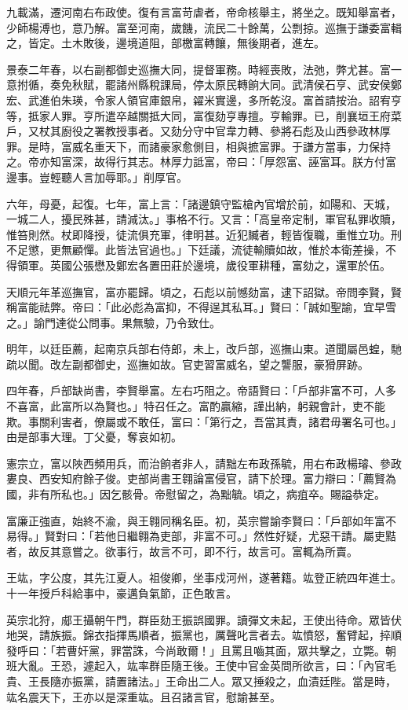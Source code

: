 \begin{pinyinscope}
九載滿，遷河南右布政使。復有言富苛虐者，帝命核舉主，將坐之。既知舉富者，少師楊溥也，意乃解。富至河南，歲饑，流民二十餘萬，公剽掠。巡撫于謙委富輯之，皆定。土木敗後，邊境道阻，部檄富轉饟，無後期者，進左。

景泰二年春，以右副都御史巡撫大同，提督軍務。時經喪敗，法弛，弊尤甚。富一意拊循，奏免秋賦，罷諸州縣稅課局，停太原民轉餉大同。武清侯石亨、武安侯鄭宏、武進伯朱瑛，令家人領官庫銀帛，糴米實邊，多所乾沒。富首請按治。詔宥亨等，抵家人罪。亨所遣卒越關抵大同，富復劾亨專擅。亨輸罪。已，削襄垣王府菜戶，又杖其廚役之署教授事者。又劾分守中官韋力轉、參將石彪及山西參政林厚罪。是時，富威名重天下，而諸豪家愈側目，相與摭富罪。于謙方當事，力保持之。帝亦知富深，故得行其志。林厚力詆富，帝曰：「厚怨富、誣富耳。朕方付富邊事。豈輕聽人言加辱耶。」削厚官。

六年，母憂，起復。七年，富上言：「諸邊鎮守監槍內官增於前，如陽和、天城，一城二人，擾民殊甚，請減汰。」事格不行。又言：「高皇帝定制，軍官私罪收贖，惟笞則然。杖即降授，徒流俱充軍，律明甚。近犯贓者，輕皆復職，重惟立功。刑不足懲，更無顧憚。此皆法官過也。」下廷議，流徒輸贖如故，惟於本衛差操，不得領軍。英國公張懋及鄭宏各置田莊於邊境，歲役軍耕種，富劾之，還軍於伍。

天順元年革巡撫官，富亦罷歸。頃之，石彪以前憾劾富，逮下詔獄。帝問李賢，賢稱富能祛弊。帝曰：「此必彪為富抑，不得逞其私耳。」賢曰：「誠如聖諭，宜早雪之。」諭門達從公問事。果無驗，乃令致仕。

明年，以廷臣薦，起南京兵部右侍郎，未上，改戶部，巡撫山東。道聞屬邑蝗，馳疏以聞。改左副都御史，巡撫如故。官吏習富威名，望之讋服，豪猾屏跡。

四年春，戶部缺尚書，李賢舉富。左右巧阻之。帝語賢曰：「戶部非富不可，人多不喜富，此富所以為賢也。」特召任之。富酌贏縮，謹出納，躬親會計，吏不能欺。事關利害者，僚屬或不敢任，富曰：「第行之，吾當其責，諸君毋署名可也。」由是部事大理。丁父憂，奪哀如初。

憲宗立，富以陜西頻用兵，而治餉者非人，請黜左布政孫毓，用右布政楊璿、參政婁良、西安知府餘子俊。吏部尚書王翱論富侵官，請下於理。富力辯曰：「薦賢為國，非有所私也。」因乞骸骨。帝慰留之，為黜毓。頃之，病疽卒。賜謚恭定。

富廉正強直，始終不渝，與王翱同稱名臣。初，英宗嘗諭李賢曰：「戶部如年富不易得。」賢對曰：「若他日繼翱為吏部，非富不可。」然性好疑，尤惡干請。屬吏黠者，故反其意嘗之。欲事行，故言不可，即不行，故言可。富輒為所賣。

王竑，字公度，其先江夏人。祖俊卿，坐事戍河州，遂著籍。竑登正統四年進士。十一年授戶科給事中，豪邁負氣節，正色敢言。

英宗北狩，郕王攝朝午門，群臣劾王振誤國罪。讀彈文未起，王使出待命。眾皆伏地哭，請族振。錦衣指揮馬順者，振黨也，厲聲叱言者去。竑憤怒，奮臂起，捽順發呼曰：「若曹奸黨，罪當誅，今尚敢爾！」且罵且嚙其面，眾共擊之，立斃。朝班大亂。王恐，遽起入，竑率群臣隨王後。王使中官金英問所欲言，曰：「內官毛貴、王長隨亦振黨，請置諸法。」王命出二人。眾又捶殺之，血漬廷陛。當是時，竑名震天下，王亦以是深重竑。且召諸言官，慰諭甚至。


\end{pinyinscope}
